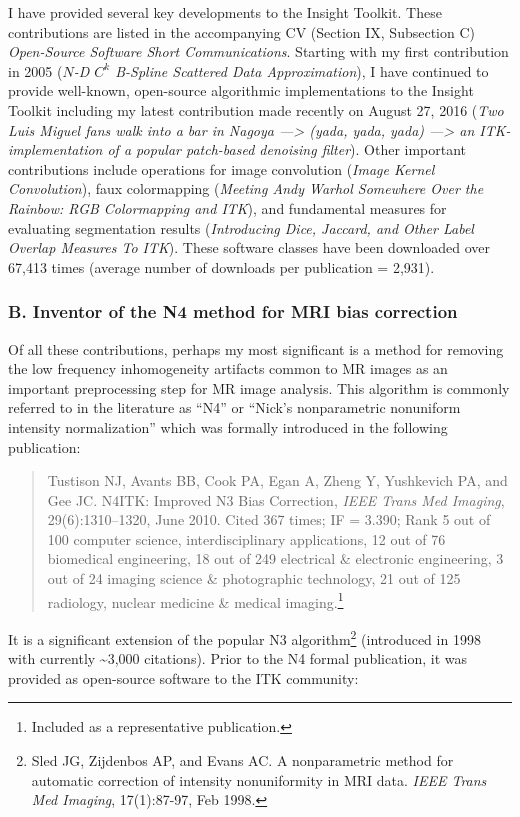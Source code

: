 \documentclass[11pt,]{article}
\let\rmarkdownfootnote\footnote%
\def\footnote{\protect\rmarkdownfootnote}
\begin{document}
I have provided several key developments to the Insight Toolkit. These
contributions are listed in the accompanying CV (Section IX, Subsection
C) \emph{Open-Source Software Short Communications}. Starting with my
first contribution in 2005 (\emph{\(N\)-D \(C^k\) B-Spline Scattered
Data Approximation}), I have continued to provide well-known,
open-source algorithmic implementations to the Insight Toolkit including
my latest contribution made recently on August 27, 2016 (\emph{Two Luis
Miguel fans walk into a bar in Nagoya ---\textgreater{} (yada, yada,
yada) ---\textgreater{} an ITK-implementation of a popular patch-based
denoising filter}). Other important contributions include operations for
image convolution (\emph{Image Kernel Convolution}), faux colormapping
(\emph{Meeting Andy Warhol Somewhere Over the Rainbow: RGB Colormapping
and ITK}), and fundamental measures for evaluating segmentation results
(\emph{Introducing Dice, Jaccard, and Other Label Overlap Measures To
ITK}). These software classes have been downloaded over 67,413 times
(average number of downloads per publication = 2,931).

\subsubsection{B. Inventor of the N4 method for MRI bias
correction}\label{b.-inventor-of-the-n4-method-for-mri-bias-correction}

Of all these contributions, perhaps my most significant is a method for
removing the low frequency inhomogeneity artifacts common to MR images
as an important preprocessing step for MR image analysis. This algorithm
is commonly referred to in the literature as ``N4'' or ``Nick's
nonparametric nonuniform intensity normalization'' which was formally
introduced in the following publication:

\begin{quote}
Tustison NJ, Avants BB, Cook PA, Egan A, Zheng Y, Yushkevich PA, and Gee
JC. N4ITK: Improved N3 Bias Correction, \emph{IEEE Trans Med Imaging},
29(6):1310--1320, June 2010. Cited 367 times; IF = 3.390; Rank 5 out of
100 computer science, interdisciplinary applications, 12 out of 76
biomedical engineering, 18 out of 249 electrical \& electronic
engineering, 3 out of 24 imaging science \& photographic technology, 21
out of 125 radiology, nuclear medicine \& medical imaging.\footnote{Included
  as a representative publication.}
\end{quote}

It is a significant extension of the popular N3 algorithm\footnote{Sled
  JG, Zijdenbos AP, and Evans AC. A nonparametric method for automatic
  correction of intensity nonuniformity in MRI data. \emph{IEEE Trans
  Med Imaging}, 17(1):87-97, Feb 1998.} (introduced in 1998 with
currently \textasciitilde{}3,000 citations). Prior to the N4 formal
publication, it was provided as open-source software to the ITK
community:
\end{document}
